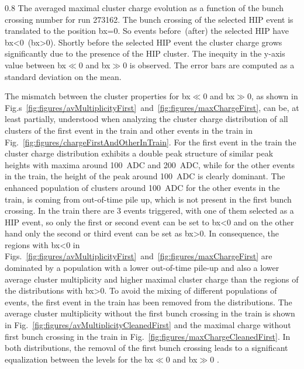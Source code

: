                  {0.8}       %
                 {The averaged maximal cluster charge evolution as a function of the bunch crossing number for run 273162. The bunch crossing of the selected HIP event is translated to the position bx=0. So events before~(after) the selected HIP have bx<0~(bx>0).  Shortly before the selected HIP event the cluster charge grows significantly due to the presence of the HIP cluster. The inequity in the y-axis value between bx$\ll$0 and bx$\gg$0 is observed. The error bars are computed as a standard deviation on the mean. } %

The mismatch between the cluster properties for bx$\ll$0 and bx$\gg$0, as shown in Fig.s~\ref{fig:figures/avMultiplicityFirst}~and~\ref{fig:figures/maxChargeFirst}, can be, at least partially, understood when analyzing the cluster charge distribution of all clusters of the first event in the train and other events in the train in Fig.~\ref{fig:figures/chargeFirstAndOtherInTrain}. For the first event in the train the cluster charge distribution exhibits a double peak structure of similar peak heights with maxima around 100~ADC and 200~ADC, while for the other events in the train, the height of the peak around 100~ADC is clearly dominant. The enhanced population of clusters around 100~ADC for the other events in the train, is coming from out-of-time pile up, which is not present in the first bunch crossing. In the train there are 3 events triggered, with one of them selected as a HIP event, so only the first or second event can be set to bx<0 and on the other hand only the second or third event can be set as bx>0. In consequence, the regions with bx<0 in Figs.~\ref{fig:figures/avMultiplicityFirst}~and~\ref{fig:figures/maxChargeFirst} are dominated by a population with a lower out-of-time pile-up and also a lower  average cluster multiplicity and higher maximal cluster charge than the regions of the distributions with bx>0. To avoid the mixing of different populations of events, the first event in the train has been removed from the distributions. The average cluster multiplicity without the first bunch crossing in the train is shown in Fig.~\ref{fig:figures/avMultiplicityCleanedFirst} and the maximal charge without first bunch crossing in the train in Fig.~\ref{fig:figures/maxChargeCleanedFirst}. In both distributions, the removal of the first bunch crossing leads to a significant equalization between the levels for the bx$\ll$0 and bx$\gg$0 .

